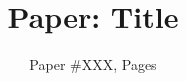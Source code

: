 \documentclass[letterpaper,twocolumn,10pt]{article}
\date{}
\theoremstyle{plain}
\theoremstyle{definition}
\begin{document}
	

	\date{}
	
  \title{\Large \bf Paper: Title}

	
	\author{Paper \#XXX, \pageref{EndOfPaper} Pages}
	
	
	\pagestyle{plain}
	
	
	\maketitle
	
	


	
	
	
	
	
	
	
	
  \label{EndOfPaper}
	

	\newpage
	{
		
		
	}
	\clearpage


	
	
\end{document}
